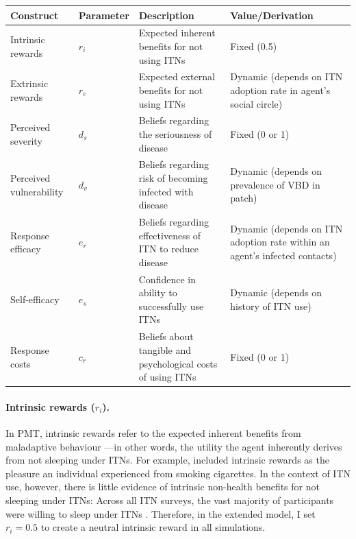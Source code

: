 \begin{table}[htp!]
    \centering
    \footnotesize
    \begin{adjustbox}{center}
    \begin{tabular}{m{3cm} >{\centering\arraybackslash}m{2cm} m{5cm} m{5cm}} \toprule
        Construct & Parameter & Description & Value/Derivation \\ \midrule
        
        Intrinsic rewards & $r_i$ & Expected inherent benefits for not using ITNs & Fixed (0.5) \\[.5cm]

        Extrinsic rewards & $r_e$ & Expected external benefits for not using ITNs & Dynamic (depends on ITN adoption rate in agent's social circle) \\[.5cm]

        Perceived severity & $d_s$ & Beliefs regarding the seriousness of disease & Fixed (0 or 1) \\[.5cm]

        Perceived vulnerability & $d_v$ & Beliefs regarding risk of becoming infected with disease & Dynamic (depends on prevalence of VBD in patch) \\[.5cm]

        Response efficacy & $e_r$ & Beliefs regarding effectiveness of ITN to reduce disease & Dynamic (depends on ITN adoption rate within an agent's infected contacts) \\[.5cm]

        Self-efficacy & $e_s$ & Confidence in ability to successfully use ITNs & Dynamic (depends on history of ITN use) \\[.5cm]

        Response costs & $c_r$ & Beliefs about tangible and psychological costs of using ITNs & Fixed (0 or 1) \\ \bottomrule
    \end{tabular}
    \end{adjustbox}
    \label{tab:pmt-params}
\end{table}

\paragraph{Intrinsic rewards ($r_i$).}In PMT, intrinsic rewards refer to the expected inherent benefits from maladaptive behaviour \cite{marikyan_protection_2023}---in other words, the utility the agent inherently derives from not sleeping under ITNs. For example, \citet{kurchyna_seeing_2024} included intrinsic rewards as the pleasure an individual experienced from smoking cigarettes. In the context of ITN use, however, there is little evidence of intrinsic non-health benefits for not sleeping under ITNs: Across all ITN surveys, the vast majority of participants were willing to sleep under ITNs \cite{watanabe_determinants_2014, yirsaw_insecticide-treated_2021, manuv_investigating_2023}. Therefore, in the extended model, I set $r_i=0.5$ to create a neutral intrinsic reward in all simulations.

